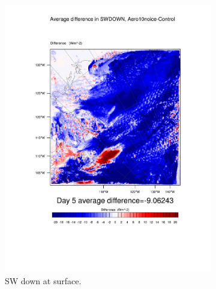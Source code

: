 \begin{figure}
\centering
	\begin{subfigure}{0.48\textwidth}
		\includegraphics[width=\textwidth]{results/aero10ni/diff_Aero10NoIce_SWDOWN_Day5.pdf}
		\caption{SW down at surface.}
		\label{subfig:swdown_r4Day5}
	\end{subfigure}
	\quad
	\begin{subfigure}{0.48\textwidth}
		\centering

\end{subfigure}
\end{figure}
